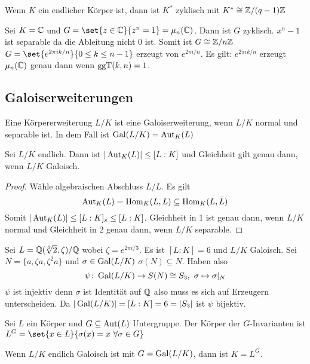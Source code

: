 \begin{Kor}
    Wenn \(K\) ein endlicher Körper ist, dann ist \(K^*\) zyklisch mit \(K^*\cong \mathbb{Z}/(q-1)\mathbb{Z}\)
\end{Kor}
\begin{Bsp}
    Sei \(K=\mathbb{C}\) und \(G=\set{z\in\CC}{ z^n=1}=\mu_n(\CC)\). Dann ist \(G\) zyklisch. \(x^n-1\) ist separable da die Ableitung nicht \(0\) ist. Somit ist \(G\cong \mathbb{Z}/n\mathbb{Z}\) \(G=\set{e^{2\pi i k/n}}{ 0\leq k\leq n-1}\) erzeugt von \(e^{2\pi i/n}\). 
    Es gilt: \(e^{2\pi i k/n}\) erzeugt \(\mu_n(\mathbb{C})\) genau dann wenn \(\operatorname{ggT}(k,n)=1\).
\end{Bsp}
\subsection{Galoiserweiterungen}
\begin{Def}
    Eine Körpererweiterung \(L/K\) ist eine Galoiserweiterung, wenn \(L/K\) normal und separable ist. In dem Fall ist \(\operatorname{Gal}(L/K)=\operatorname{Aut}_K(L)\)
\end{Def}
\begin{Satz}
    Sei \(L/K\) endlich. Dann ist \(|\operatorname{Aut}_K(L)|\leq [L:K]\) und Gleichheit gilt genau dann, wenn \(L/K\) Galoisch.
\end{Satz}
\begin{proof}
    Wähle algebraischen Abschluss \(\bar L/L\). Es gilt 
    \[\operatorname{Aut}_K(L)=\operatorname{Hom}_K(L,L)\subseteq \operatorname{Hom}_K(L,\bar L)\]
    Somit \(|\operatorname{Aut}_K(L)|\leq [L:K]_s\leq [L:K]\).
    Gleichheit in 1 ist genau dann, wenn \(L/K\) normal und Gleichheit in 2 genau dann, wenn \(L/K\) separable.
\end{proof}
\begin{Bsp}
    Sei \(L=\mathbb{Q}(\sqrt[3]{2},\zeta)/\mathbb{Q}\) wobei \(\zeta=e^{2\pi i/3}\). Es ist \([L:K]=6\) und \(L/K\) Galoisch. Sei \(N=\{a,\zeta a,\zeta^2 a\}\) und \(\sigma\in\operatorname{Gal}(L/K)\) \(\sigma(N)\subseteq N\). Haben also 
    \[\psi\colon \operatorname{Gal}(L/K)\to S(N)\cong S_3,\ \sigma\mapsto \sigma|_N\]
    \(\psi\) ist injektiv denn \(\sigma\) ist Identität auf \(\mathbb{Q}\) also muss es sich auf Erzeugern unterscheiden. Da \(|\operatorname{Gal}(L/K)|=[L:K]=6=|S_3|\) ist \(\psi\) bijektiv.
\end{Bsp}
\begin{Def}
    Sei \(L\) ein Körper und \(G\subseteq \operatorname{Aut}(L)\) Untergruppe.
    Der Körper der \(G\)-Invarianten ist \(L^G=\set{x\in L}{\sigma(x)=x\ \forall \sigma\in G}\)
\end{Def}
\begin{Lemma}\label{Lem:Galois1}
    Wenn \(L/K\) endlich Galoisch ist mit \(G=\operatorname{Gal}(L/K)\), dann ist \(K=L^G\).
\end{Lemma}
